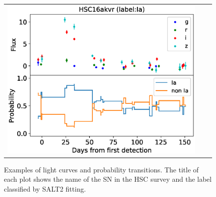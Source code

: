 \documentclass[proof]{pasj01}
\begin{document}
\begin{figure}[htbp]
\begin{tabular}{ccc}
\begin{minipage}{0.33\hsize}
\begin{center}
            \end{center}
        \end{minipage}
        \begin{minipage}{0.33\hsize}
            \begin{center}
                \includegraphics[width=\columnwidth]{figures/lcp_akvr.eps}
            \end{center}
        \end{minipage}
    \end{tabular}
    \vspace{3mm}
    \caption{%
    Examples of light curves and probability transitions. The title of each plot shows the name of the SN in the HSC survey and the label classified by SALT2 fitting.
    }%
    \label{fig:lcps}
\end{figure}
%
\end{document}
